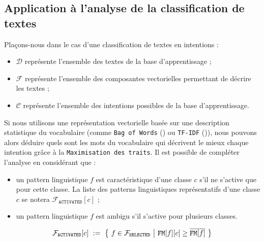 	
	\subsection{Application à l'analyse de la classification de textes}
	\label{annex:C.3.4-DESCRIPTION-IMPLEMENTATION-FEATURES-MAXIMIZATION-METRIC-APPLICATION-TEXTES}
	
		Plaçons-nous dans le cas d'une classification de textes en intentions :
		\begin{itemize}
			\item $\mathcal{D}$ représente l'ensemble des textes de la base d'apprentissage ;
			\item $\mathcal{F}$ représente l'ensemble des composantes vectorielles permettant de décrire les textes ;
			\item $\mathcal{C}$ représente l'ensemble des intentions possibles de la base d'apprentissage.
		\end{itemize}
		
		Si nous utilisons une représentation vectorielle basée sur une description statistique du vocabulaire (comme \texttt{Bag of Words} (\cite{harris:1954:distributional-structure}) ou \texttt{TF-IDF} (\cite{ramos:2003:using-tfidf-determine})), nous pouvons alors déduire quels sont les mots du vocabulaire qui décrivent le mieux chaque intention grâce à la \texttt{Maximisation des traits}.
		Il est possible de compléter l'analyse en considérant que :
		\begin{itemize}
			\item un pattern linguistique $f$ est caractéristique d'une classe $c$ s'il ne s'active que pour cette classe. La liste des patterns linguistiques représentatifs d'une classe $c$ se notera $\mathcal{F}_{\texttt{ACTIVATED}}[c]$ ;
			\item un pattern linguistique $f$ est ambigu s'il s'active pour plusieurs classes.
		\end{itemize}
		
		\begin{equation}
			\label{equation:C.3.4-DESCRIPTION-IMPLEMENTATION-FEATURES-MAXIMIZATION-METRIC-PATTERN-ACTIVATION}
			\mathcal{F}_{\texttt{ACTIVATED}}[c]
				~:=~\bigl\{~
					f \in \mathcal{F}_{\texttt{SELECTED}}
					~\big|~
					\texttt{FM}[f][c] \geq \overline{\texttt{FM}[f]}
				~\bigr\} \\
		\end{equation}
		
